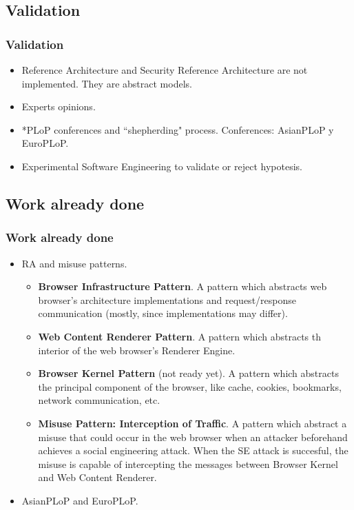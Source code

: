 \documentclass[serif,9pt]{beamer}
\begin{document}
\subsection{Validation}
\begin{frame}
	\frametitle{Validation}	
	\begin{itemize}
	\item<1-> Reference Architecture and Security Reference Architecture are not implemented. They are abstract models.
	\item<1-> Experts opinions.
	\item<2-> *PLoP conferences and ``shepherding" process. Conferences: AsianPLoP y EuroPLoP.
	\item<2-> Experimental Software Engineering to validate or reject hypotesis. 
	\end{itemize}
\end{frame}

\subsection{Work already done}
\begin{frame}
	\frametitle{Work already done}
	\begin{itemize}
		\item RA and misuse patterns.
			\begin{itemize}
				\item<1-> \textbf{Browser Infrastructure Pattern}. A pattern which abstracts web browser's architecture implementations and request/response communication (mostly, since implementations may differ).
				\item<1-> \textbf{Web Content Renderer Pattern}. A pattern which abstracts th interior of the web browser's Renderer Engine.
				\item<2-> \textbf{Browser Kernel Pattern} (not ready yet). A pattern which abstracts the principal component of the browser, like cache, cookies, bookmarks, network communication, etc.
				\item<3-> \textbf{Misuse Pattern: Interception of Traffic}. A pattern which abstract a misuse that could occur in the web browser when an attacker beforehand achieves a social engineering attack. When the SE attack is succesful, the misuse is capable of intercepting the messages between Browser Kernel and Web Content Renderer.
			\end{itemize}
		\item<4-> AsianPLoP and EuroPLoP.
	\end{itemize}
\end{frame}
\end{document}
